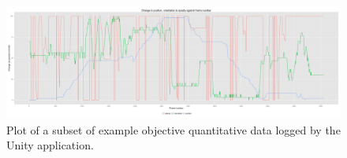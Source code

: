 \documentclass[conference]{acmsiggraph}
\begin{document}
\begin{figure}[t]
	\begin{center}
		\includegraphics[width=\linewidth]{images/graph.png}
		\caption{Plot of a subset of example objective quantitative data logged by the Unity application.}
		\label{plot}
	\end{center}
\end{figure}




\end{document}
